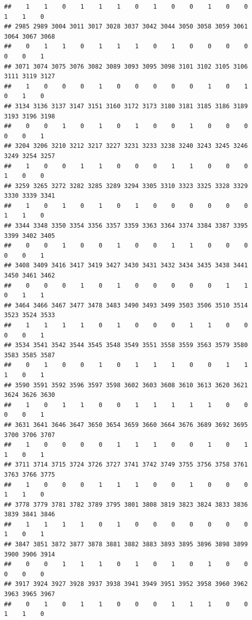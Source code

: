 \documentclass[
]{article}
\begin{document}
\begin{verbatim}
##    1    1    0    1    1    1    0    1    0    0    1    0    0    1    1    0 
## 2985 2989 3004 3011 3017 3028 3037 3042 3044 3050 3058 3059 3061 3064 3067 3068 
##    0    1    1    0    1    1    1    0    1    0    0    0    0    0    0    1 
## 3071 3074 3075 3076 3082 3089 3093 3095 3098 3101 3102 3105 3106 3111 3119 3127 
##    1    0    0    0    1    0    0    0    0    0    1    0    1    0    1    0 
## 3134 3136 3137 3147 3151 3160 3172 3173 3180 3181 3185 3186 3189 3193 3196 3198 
##    0    0    1    0    1    0    1    0    0    1    0    0    0    0    0    1 
## 3204 3206 3210 3212 3217 3227 3231 3233 3238 3240 3243 3245 3246 3249 3254 3257 
##    1    0    0    1    1    0    0    0    1    1    0    0    0    1    0    0 
## 3259 3265 3272 3282 3285 3289 3294 3305 3310 3323 3325 3328 3329 3330 3339 3341 
##    1    0    1    0    1    0    1    0    0    0    0    0    0    1    1    0 
## 3344 3348 3350 3354 3356 3357 3359 3363 3364 3374 3384 3387 3395 3399 3402 3405 
##    0    0    1    0    0    1    0    0    1    1    0    0    0    0    0    1 
## 3408 3409 3416 3417 3419 3427 3430 3431 3432 3434 3435 3438 3441 3450 3461 3462 
##    0    0    0    1    0    1    0    0    0    0    0    1    1    0    1    1 
## 3464 3466 3467 3477 3478 3483 3490 3493 3499 3503 3506 3510 3514 3523 3524 3533 
##    1    1    1    1    0    1    0    0    0    1    1    0    0    0    0    1 
## 3534 3541 3542 3544 3545 3548 3549 3551 3558 3559 3563 3579 3580 3583 3585 3587 
##    0    1    0    0    1    0    1    1    1    0    0    1    1    1    0    1 
## 3590 3591 3592 3596 3597 3598 3602 3603 3608 3610 3613 3620 3621 3624 3626 3630 
##    1    0    1    1    0    0    1    1    1    1    1    0    0    0    0    1 
## 3631 3641 3646 3647 3650 3654 3659 3660 3664 3676 3689 3692 3695 3700 3706 3707 
##    1    0    0    0    0    1    1    1    0    0    1    0    1    1    0    1 
## 3711 3714 3715 3724 3726 3727 3741 3742 3749 3755 3756 3758 3761 3763 3766 3775 
##    1    0    0    0    1    1    1    0    0    1    0    0    0    1    1    0 
## 3778 3779 3781 3782 3789 3795 3801 3808 3819 3823 3824 3833 3836 3839 3841 3846 
##    1    1    1    1    0    1    0    0    0    0    0    0    0    1    0    1 
## 3847 3851 3872 3877 3878 3881 3882 3883 3893 3895 3896 3898 3899 3900 3906 3914 
##    0    0    1    1    1    0    1    0    1    0    1    0    0    0    0    0 
## 3917 3924 3927 3928 3937 3938 3941 3949 3951 3952 3958 3960 3962 3963 3965 3967 
##    0    1    0    1    1    0    0    0    1    1    1    0    0    1    1    0 

\end{verbatim}
\end{document}
